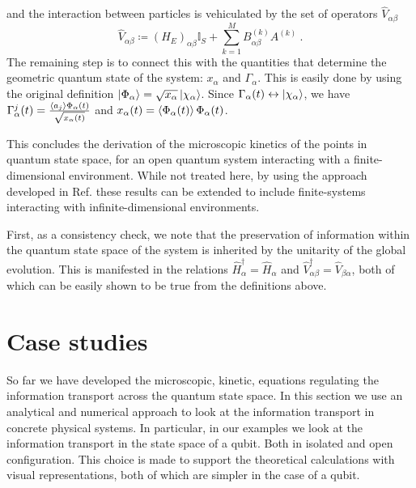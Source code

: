 \documentclass[draft,nofootinbib,pre,twocolumn,showpacs,showkeys,preprintnumbers,floatfix]{revtex4-1}
\newcommand{\1}{\mathbbm{1}}
\begin{document}
and the interaction between particles is vehiculated by the set of operators $\hat{V}_{\alpha \beta}$
\begin{equation}
\hat{V}_{\alpha \beta} \coloneqq \left( H_E\right)_{\alpha \beta} \mathbb{I}_S + \sum_{k=1}^M B^{(k)}_{\alpha \beta} A^{(k)}~.\label{ed:def_V}
\end{equation}
The remaining step is to connect this with the quantities that determine the geometric quantum state of the system: $x_\alpha$ and $\Gamma_\alpha$.
This is easily done by using the original definition $\ket{\Phi_\alpha} = \sqrt{x_\alpha} \ket{\chi_\alpha}$. Since $\Gamma_\alpha(t) \leftrightarrow \ket{\chi_\alpha}$,
we have $\Gamma^j_\alpha(t) = \frac{\braket{a_j}{\Phi_\alpha(t)}}{\sqrt{x_\alpha(t)}}$ and $x_\alpha(t) = \braket{\Phi_\alpha(t)}{\Phi_\alpha(t)}$.


This concludes the derivation of the microscopic kinetics of the points in quantum state space, for an open quantum system interacting
with a finite-dimensional environment. While not treated here, by using the approach developed in Ref.\cite{Anza2020a} these results
can be extended to include finite-systems interacting with infinite-dimensional environments.

First, as a consistency check, we note that the preservation of information within the quantum state space of the system is inherited by the 
unitarity of the global evolution. This is manifested in the relations $\hat{H}_\alpha^\dagger = \hat{H}_\alpha$ and $\hat{V}_{\alpha \beta}^{\dagger} = \hat{V}_{\beta \alpha}$, 
both of which can be easily shown to be true from the definitions above.


\section{Case studies}
\label{sec:EXAMPLES}

So far we have developed the microscopic, kinetic, equations regulating the 
information transport across the quantum state space. In this section we use
an analytical and numerical approach to look at the information transport in 
concrete physical systems. In particular, in our examples we look at the information
transport in the state space of a qubit. Both in isolated and open configuration.
This choice is made to support the theoretical calculations with visual representations,
both of which are simpler in the case of a qubit.
\end{document}

